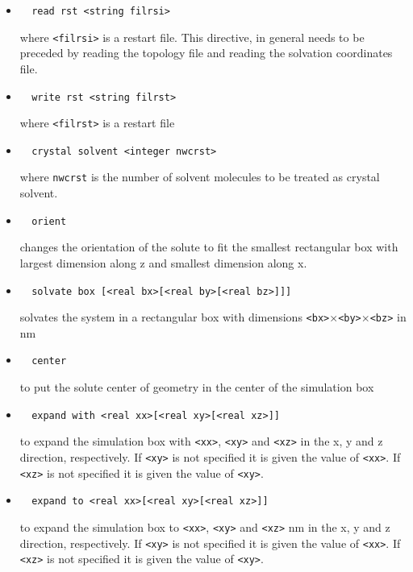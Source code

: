 \begin{itemize}
\item
\begin{verbatim}
  read rst <string filrsi>
\end{verbatim}
where \verb+<filrsi>+ is a restart file. This directive, in general needs
to be preceded by reading the topology file and reading the solvation
coordinates file.

\item
\begin{verbatim}
  write rst <string filrst>
\end{verbatim}
where \verb+<filrst>+ is a restart file

\item
\begin{verbatim}
  crystal solvent <integer nwcrst>
\end{verbatim}
where \verb+nwcrst+ is the number of solvent molecules to be treated
as crystal solvent.

\item
\begin{verbatim}
  orient
\end{verbatim}
changes the orientation of the solute to fit the smallest rectangular
box with largest dimension along z and smallest dimension along x.

\item
\begin{verbatim}
  solvate box [<real bx>[<real by>[<real bz>]]]
\end{verbatim}
solvates the system in a rectangular box with dimensions 
\verb+<bx>+$\times$\verb+<by>+$\times$\verb+<bz>+ in nm

\item
\begin{verbatim}
  center
\end{verbatim}
to put the solute center of geometry in the center of the
simulation box

\item
\begin{verbatim}
  expand with <real xx>[<real xy>[<real xz>]]
\end{verbatim}
to expand the simulation box with \verb+<xx>+, \verb+<xy>+ and 
\verb+<xz>+ in the x, y and z direction, respectively. If
\verb+<xy>+ is not specified it is given the value of \verb+<xx>+.
If \verb+<xz>+ is not specified it is given the value of \verb+<xy>+.

\item
\begin{verbatim}
  expand to <real xx>[<real xy>[<real xz>]]
\end{verbatim}
to expand the simulation box to \verb+<xx>+, \verb+<xy>+ and 
\verb+<xz>+ nm in the x, y and z direction, respectively. If
\verb+<xy>+ is not specified it is given the value of \verb+<xx>+.
If \verb+<xz>+ is not specified it is given the value of \verb+<xy>+.



\end{itemize}

